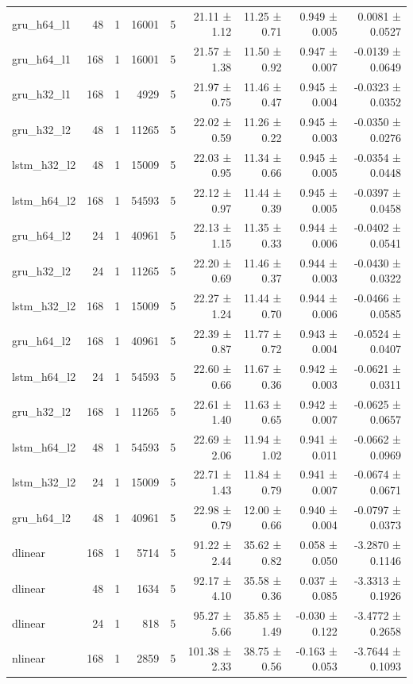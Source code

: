 \begin{table}[htbp]
\begin{tabular}{lrrrrrrrr}
gru\_h64\_l1 & 48 & 1 & 16001 & 5 & 21.11 ± 1.12 & 11.25 ± 0.71 & 0.949 ± 0.005 & 0.0081 ± 0.0527 \\
gru\_h64\_l1 & 168 & 1 & 16001 & 5 & 21.57 ± 1.38 & 11.50 ± 0.92 & 0.947 ± 0.007 & -0.0139 ± 0.0649 \\
gru\_h32\_l1 & 168 & 1 & 4929 & 5 & 21.97 ± 0.75 & 11.46 ± 0.47 & 0.945 ± 0.004 & -0.0323 ± 0.0352 \\
gru\_h32\_l2 & 48 & 1 & 11265 & 5 & 22.02 ± 0.59 & 11.26 ± 0.22 & 0.945 ± 0.003 & -0.0350 ± 0.0276 \\
lstm\_h32\_l2 & 48 & 1 & 15009 & 5 & 22.03 ± 0.95 & 11.34 ± 0.66 & 0.945 ± 0.005 & -0.0354 ± 0.0448 \\
lstm\_h64\_l2 & 168 & 1 & 54593 & 5 & 22.12 ± 0.97 & 11.44 ± 0.39 & 0.945 ± 0.005 & -0.0397 ± 0.0458 \\
gru\_h64\_l2 & 24 & 1 & 40961 & 5 & 22.13 ± 1.15 & 11.35 ± 0.33 & 0.944 ± 0.006 & -0.0402 ± 0.0541 \\
gru\_h32\_l2 & 24 & 1 & 11265 & 5 & 22.20 ± 0.69 & 11.46 ± 0.37 & 0.944 ± 0.003 & -0.0430 ± 0.0322 \\
lstm\_h32\_l2 & 168 & 1 & 15009 & 5 & 22.27 ± 1.24 & 11.44 ± 0.70 & 0.944 ± 0.006 & -0.0466 ± 0.0585 \\
gru\_h64\_l2 & 168 & 1 & 40961 & 5 & 22.39 ± 0.87 & 11.77 ± 0.72 & 0.943 ± 0.004 & -0.0524 ± 0.0407 \\
lstm\_h64\_l2 & 24 & 1 & 54593 & 5 & 22.60 ± 0.66 & 11.67 ± 0.36 & 0.942 ± 0.003 & -0.0621 ± 0.0311 \\
gru\_h32\_l2 & 168 & 1 & 11265 & 5 & 22.61 ± 1.40 & 11.63 ± 0.65 & 0.942 ± 0.007 & -0.0625 ± 0.0657 \\
lstm\_h64\_l2 & 48 & 1 & 54593 & 5 & 22.69 ± 2.06 & 11.94 ± 1.02 & 0.941 ± 0.011 & -0.0662 ± 0.0969 \\
lstm\_h32\_l2 & 24 & 1 & 15009 & 5 & 22.71 ± 1.43 & 11.84 ± 0.79 & 0.941 ± 0.007 & -0.0674 ± 0.0671 \\
gru\_h64\_l2 & 48 & 1 & 40961 & 5 & 22.98 ± 0.79 & 12.00 ± 0.66 & 0.940 ± 0.004 & -0.0797 ± 0.0373 \\
dlinear & 168 & 1 & 5714 & 5 & 91.22 ± 2.44 & 35.62 ± 0.82 & 0.058 ± 0.050 & -3.2870 ± 0.1146 \\
dlinear & 48 & 1 & 1634 & 5 & 92.17 ± 4.10 & 35.58 ± 0.36 & 0.037 ± 0.085 & -3.3313 ± 0.1926 \\
dlinear & 24 & 1 & 818 & 5 & 95.27 ± 5.66 & 35.85 ± 1.49 & -0.030 ± 0.122 & -3.4772 ± 0.2658 \\
nlinear & 168 & 1 & 2859 & 5 & 101.38 ± 2.33 & 38.75 ± 0.56 & -0.163 ± 0.053 & -3.7644 ± 0.1093 \\

\end{tabular}
\end{table}
